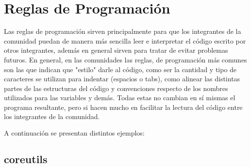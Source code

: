 \section{Reglas de Programación}
{Las reglas de programación sirven principalmente para que los integrantes de la comunidad puedan de manera más sencilla leer e interpretar el código escrito por otros integrantes, además en general sirven para tratar de evitar problemas futuros. En general, en las comunidades las reglas, de programación más comunes son las que indican que "estilo" darle al código, como ser la cantidad y tipo de caracteres se utilizan para indentar (espacios o tabs), como alinear las distintas partes de las estructuras del código y convenciones respecto de los nombres utilizados para las variables y demás. Todas estas no cambian en sí mismas el programa resultante, pero si hacen mucho en facilitar la lectura del código entre los integrantes de la comunidad.

A continuación se presentan distintos ejemplos:
}

\subsection{coreutils}

